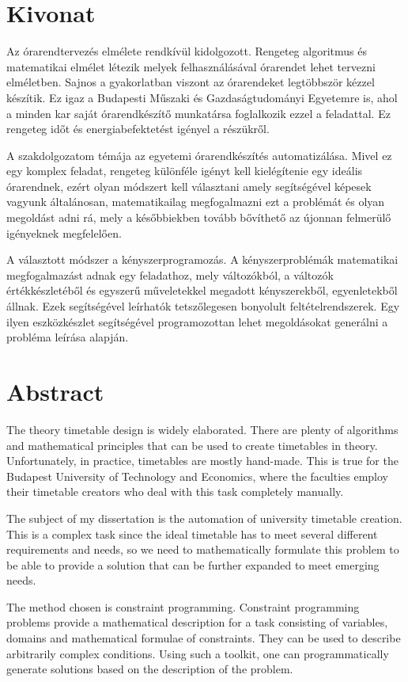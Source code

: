 \chapter*{Kivonat}

Az órarendtervezés elmélete rendkívül kidolgozott. Rengeteg algoritmus és matematikai elmélet létezik melyek felhasználásával órarendet lehet tervezni elméletben. Sajnos a gyakorlatban viszont az órarendeket legtöbbször kézzel készítik. Ez igaz a Budapesti Műszaki és Gazdaságtudományi Egyetemre is, ahol a minden kar saját órarendkészítő munkatársa foglalkozik ezzel a feladattal. Ez rengeteg időt és energiabefektetést igényel a részükről.

A szakdolgozatom témája az egyetemi órarendkészítés automatizálása. Mivel ez egy komplex feladat, rengeteg különféle igényt kell kielégítenie egy ideális órarendnek, ezért olyan módszert kell választani amely segítségével képesek vagyunk általánosan, matematikailag megfogalmazni ezt a problémát és olyan megoldást adni rá, mely a későbbiekben tovább bővíthető az újonnan felmerülő igényeknek megfelelően.

A választott módszer a kényszerprogramozás. A kényszerproblémák matematikai megfogalmazást adnak egy feladathoz, mely változókból, a változók értékkészletéből és egyszerű műveletekkel megadott kényszerekből, egyenletekből állnak. Ezek segítségével leírhatók tetszőlegesen bonyolult feltételrendszerek. Egy ilyen eszközkészlet segítségével programozottan lehet megoldásokat generálni a probléma leírása alapján.

\vfill

\chapter*{Abstract}

The theory timetable design is widely elaborated. There are plenty of algorithms and mathematical principles that can be used to create timetables in theory. Unfortunately, in practice, timetables are mostly hand-made. This is true for the Budapest University of Technology and Economics, where the faculties employ their timetable creators who deal with this task completely manually.

The subject of my dissertation is the automation of university timetable creation. This is a complex task since the ideal timetable has to meet several different requirements and needs, so we need to mathematically formulate this problem to be able to provide a solution that can be further expanded to meet emerging needs.

The method chosen is constraint programming. Constraint programming problems provide a mathematical description for a task consisting of variables, domains and mathematical formulae of constraints. They can be used to describe arbitrarily complex conditions. Using such a toolkit, one can programmatically generate solutions based on the description of the problem.

\vfill

